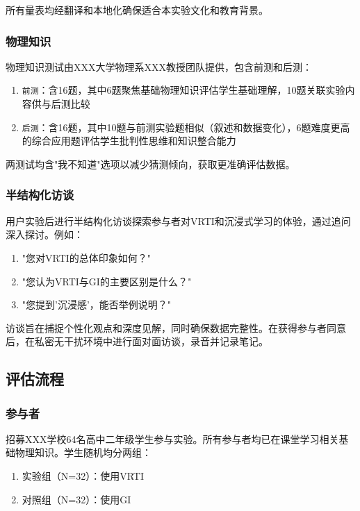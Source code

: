 \documentclass[runningheads]{llncs}
\begin{document}
所有量表均经翻译和本地化确保适合本实验文化和教育背景。

\subsubsection{物理知识}
物理知识测试由XXX大学物理系XXX教授团队提供，包含前测和后测：
\begin{enumerate}
  \item {\texttt{前测}}：含16题，其中6题聚焦基础物理知识评估学生基础理解，10题关联实验内容供与后测比较
  \item {\texttt{后测}}：含16题，其中10题与前测实验题相似（叙述和数据变化），6题难度更高的综合应用题评估学生批判性思维和知识整合能力
\end{enumerate}

两测试均含"我不知道"选项以减少猜测倾向，获取更准确评估数据。

\subsubsection{半结构化访谈}
用户实验后进行半结构化访谈探索参与者对VRTI和沉浸式学习的体验，通过追问深入探讨。例如：
\begin{enumerate}
  \item "您对VRTI的总体印象如何？"
  \item "您认为VRTI与GI的主要区别是什么？"
  \item "您提到'沉浸感'，能否举例说明？"
\end{enumerate}
访谈旨在捕捉个性化观点和深度见解，同时确保数据完整性。在获得参与者同意后，在私密无干扰环境中进行面对面访谈，录音并记录笔记。

\subsection{评估流程}
\subsubsection{参与者}
招募XXX学校64名高中二年级学生参与实验。所有参与者均已在课堂学习相关基础物理知识。学生随机均分两组：
\begin{enumerate}
  \item 实验组（N=32）：使用VRTI
  \item 对照组（N=32）：使用GI
\end{enumerate}
\end{document}
